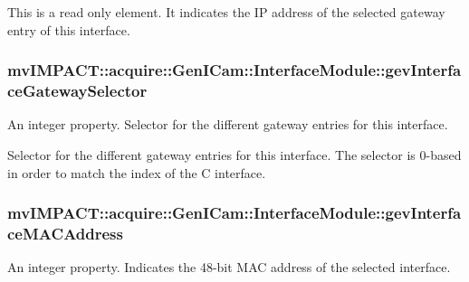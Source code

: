 This is a read only element. It indicates the I\+P address of the selected gateway entry of this interface. \hypertarget{classmv_i_m_p_a_c_t_1_1acquire_1_1_gen_i_cam_1_1_interface_module_a8bcec48c92c925d6a4b7077446187008}{
\subsubsection[{gev\+Interface\+Gateway\+Selector}]{ mv\+I\+M\+P\+A\+C\+T\+::acquire\+::\+Gen\+I\+Cam\+::\+Interface\+Module\+::gev\+Interface\+Gateway\+Selector}}\label{classmv_i_m_p_a_c_t_1_1acquire_1_1_gen_i_cam_1_1_interface_module_a8bcec48c92c925d6a4b7077446187008}


An integer property. Selector for the different gateway entries for this interface. 

Selector for the different gateway entries for this interface. The selector is 0-\/based in order to match the index of the C interface. \hypertarget{classmv_i_m_p_a_c_t_1_1acquire_1_1_gen_i_cam_1_1_interface_module_affb1e587603d3b11a90dd56ca22b61ed}{
\subsubsection[{gev\+Interface\+M\+A\+C\+Address}]{ mv\+I\+M\+P\+A\+C\+T\+::acquire\+::\+Gen\+I\+Cam\+::\+Interface\+Module\+::gev\+Interface\+M\+A\+C\+Address}}\label{classmv_i_m_p_a_c_t_1_1acquire_1_1_gen_i_cam_1_1_interface_module_affb1e587603d3b11a90dd56ca22b61ed}


An integer property. Indicates the 48-\/bit M\+A\+C address of the selected interface. 

